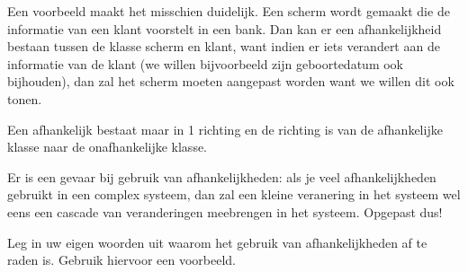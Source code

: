 Een voorbeeld maakt het misschien duidelijk. Een scherm wordt gemaakt die de informatie
van een klant voorstelt in een bank. Dan kan er een afhankelijkheid bestaan tussen de klasse
scherm en klant, want indien er iets verandert aan de informatie van de klant (we willen
bijvoorbeeld zijn geboortedatum ook bijhouden), dan zal het scherm moeten aangepast worden
want we willen dit ook tonen. 

Een afhankelijk bestaat maar in 1 richting en de richting is van de afhankelijke klasse naar
de onafhankelijke klasse.

Er is een gevaar bij gebruik van afhankelijkheden: als je veel afhankelijkheden gebruikt in een complex systeem, dan zal een kleine veranering in het systeem wel eens een cascade van
veranderingen meebrengen in het systeem. Opgepast dus!

\begin{exercise}
	Leg in uw eigen woorden uit waarom het gebruik van afhankelijkheden af te raden is. Gebruik hiervoor een voorbeeld.
\end{exercise}





